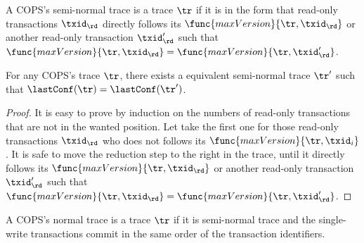A COPS's semi-normal trace is a trace \( \tr \) if it is in the form that
read-only transactions \( \txid_\rd \) directly follows its \( \func{maxVersion}{\tr, \txid_\rd} \) or another read-only transaction \( \txid_{\rd}' \) such that \( \func{maxVersion}{\tr, \txid_\rd}  =  \func{maxVersion}{\tr, \txid_{\rd}'}\).


\begin{corollary}
    \label{lem:cops-semi-normal-trace}
    \label{cor:cops-semi-normal-trace}
    For any COPS's trace \( \tr \), there exists a equivalent semi-normal trace \( \tr' \) 
    such that \( \lastConf(\tr) = \lastConf(\tr') \).
\end{corollary}
\begin{proof}
    It is easy to prove by induction on the numbers of read-only transactions that are not in the wanted position.
    Let take the first one for those read-only transactions \( \txid_\rd \) who does not follows its \( \func{maxVersion}{\tr, \txid_i} \).
    It is safe to move the reduction step to the right in the trace,
    until it directly follows its \( \func{maxVersion}{\tr, \txid_\rd} \) or another read-only transaction \( \txid_{\rd}' \) such that \( \func{maxVersion}{\tr, \txid_\rd}  =  \func{maxVersion}{\tr, \txid_{\rd}'}\). 
\end{proof}

A COPS's normal trace is a trace \( \tr \) if it is semi-normal trace and the single-write transactions commit in the same order of the transaction identifiers.

